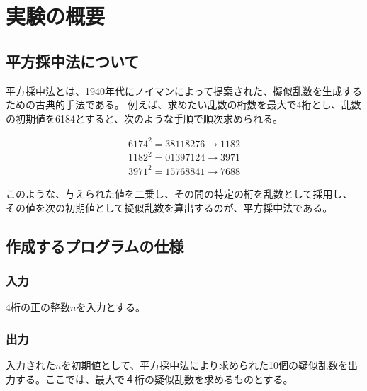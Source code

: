 

\section{実験の概要}
\subsection{平方採中法について}
  平方採中法とは、1940年代にノイマンによって提案された、擬似乱数を生成するための古典的手法である。
  例えば、求めたい乱数の桁数を最大で4桁とし、乱数の初期値を6184とすると、次のような手順で順次求められる。

  \begin{align*}
    6174^2 = 38118276 → 1182 \\
    1182^2 = 01397124 → 3971 \\
    3971^2 = 15768841 → 7688
  \end{align*}

  このような、与えられた値を二乗し、その間の特定の桁を乱数として採用し、
  その値を次の初期値として擬似乱数を算出するのが、平方採中法である。

\subsection{作成するプログラムの仕様}
  \subsubsection{入力}
    4桁の正の整数$n$を入力とする。

  \subsubsection{出力}
    入力された$n$を初期値として、平方採中法により求められた10個の疑似乱数を出力する。ここでは、最大で４桁の疑似乱数を求めるものとする。



